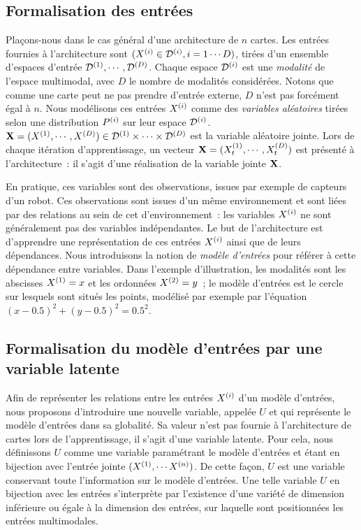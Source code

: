 \documentclass[../main]{subfiles}
\begin{document}
\subsection{Formalisation des entrées}

Plaçons-nous dans le cas général d'une architecture de $n$ cartes.
Les entrées fournies à l'architecture sont $(X^{({i})} \in \mathcal{D}^{({i})}, i = 1 \cdots D)$, tirées d'un ensemble d'espaces d'entrée $\mathcal{D}^{({1})},\cdots,\mathcal{D}^{({D})}$. 
Chaque espace $\mathcal{D}^{({i})}$ est une \emph{modalité} de l'espace multimodal, avec $D$ le nombre de modalités considérées. Notons que comme une carte peut ne pas prendre d'entrée externe, $D$ n'est pas forcément égal à $n$. 
Nous modélisons ces entrées $X^{({i})}$ comme des \emph{variables aléatoires} tirées selon une distribution $P^{({i})}$ sur leur espace $\mathcal{D}^{({i})}$.
$\mathbf{X} = (X^{({1})}, \cdots, X^{({D})}) \in \mathcal{D}^{({1})} \times \cdots \times \mathcal{D}^{({D})}$ est la variable aléatoire jointe. 
Lors de chaque itération d'apprentissage, un vecteur $\mathbf{X} = (X^{({1})}_t, \cdots , X^{({D})}_t)$ est présenté à l'architecture~: il s'agit d'une réalisation de la variable jointe $\mathbf{X}$.

En pratique, ces variables sont des observations, issues par exemple de capteurs d'un robot. Ces observations sont issues d'un même environnement et sont liées par des relations au sein de cet d'environnement~: les variables $X^{({i})}$ ne sont généralement pas des variables indépendantes.
Le but de l'architecture est d'apprendre une représentation de ces entrées $X^{({i})}$ ainsi que de leurs dépendances.
Nous introduisons la notion de \emph{modèle d'entrées} pour référer à cette dépendance entre variables.
Dans l'exemple d'illustration, les modalités sont les abscisses $X^{({1})} = x$ et les ordonnées $X^{({2})} = y$~; le modèle d'entrées est le cercle sur lesquels sont situés les points, modélisé par exemple par l'équation $(x - 0.5)^2 + (y - 0.5)^2 = 0.5^2$.

\subsection{Formalisation du modèle d'entrées par une variable latente}\label{sec:U}

Afin de représenter les relations entre les entrées $X^{({i})}$ d'un modèle d'entrées, nous proposons d'introduire une nouvelle variable, appelée $U$ et qui représente le modèle d'entrées dans sa globalité.
Sa valeur n'est pas fournie à l'architecture de cartes lors de l'apprentissage, il s'agit d'une variable latente.
Pour cela, nous définissons $U$ comme une variable paramétrant le modèle d'entrées et étant en bijection avec l'entrée jointe $(X^{({1})}, \cdots X^{({n})})$. De cette façon, $U$ est une variable conservant toute l'information sur le modèle d'entrées.
Une telle variable $U$ en bijection avec les entrées s'interprète par l'existence d'une variété de dimension inférieure ou égale à la dimension des entrées, sur laquelle sont positionnées les entrées multimodales.
\end{document}
